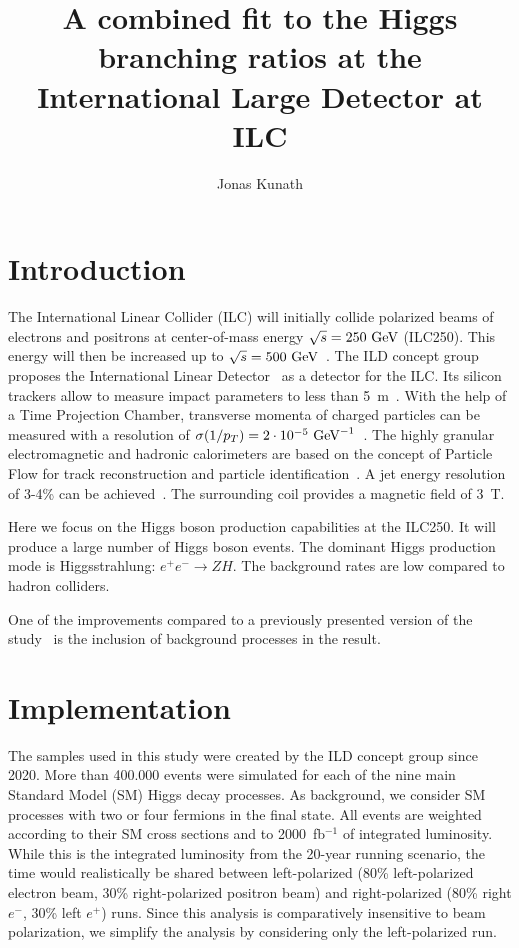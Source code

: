 \documentclass[a4paper,11pt]{article}
\title{A combined fit to the Higgs branching ratios at the International Large Detector at ILC}
\author*[a,\dag]{Jonas Kunath}
\affiliation[a]{Laboratoire Leprince-Ringuet, IN2P3-CNRS, École Polytechnique, Institut Polytechnique de Paris\\
Route de Saclay, 91120 Palaiseau, France}
\newcommand{\eV}{\text{e\kern-0.15ex V}\xspace}
\newcommand{\GeV}{\text{G\eV}\xspace}
\begin{document}
\maketitle

\section{Introduction}
The International Linear Collider (ILC) will initially collide polarized beams
of electrons and positrons at center-of-mass energy $\sqrt{s}=250~\GeV$ (ILC250).
This energy will then be increased up to $\sqrt{s}=500~\GeV$~\cite{ILC_Staging_2017}.
The ILD concept group proposes the International Linear Detector~\cite{ILD_DBD,ILD_IDR}
as a detector for the ILC.
Its silicon trackers allow to measure impact parameters to less than 5~{\textmu}m~\cite{ILD_IDR}.
With the help of a Time Projection Chamber, transverse momenta of charged particles
can be measured with a resolution of $\sigma(1/p_T) = 2 \cdot 10^{-5}~\GeV^{-1}$~\cite{ILD_IDR}.
The highly granular electromagnetic and hadronic calorimeters
are based on the concept of Particle Flow
for track reconstruction and particle identification~\cite{ParticleFlow}.
A jet energy resolution of 3-4\% can be achieved~\cite{ILD_IDR}.
The surrounding coil provides a magnetic field of 3~T.

Here we focus on the Higgs boson production capabilities at the ILC250.
It will produce a large number of Higgs boson events.
The dominant Higgs production mode is Higgsstrahlung: $e^+e^- \to ZH$.
The background rates are low compared to hadron colliders.

One of the improvements compared to
a previously presented version of the study~\cite{LCWS_combined_Higgs}
is the inclusion of background processes in the result.

\section{Implementation}\label{sec:Implementation}
The samples used in this study were created by the ILD concept group since 2020.
More than 400.000 events were simulated for each of the nine main Standard Model (SM)
Higgs decay processes.
As background, we consider SM processes
with two or four fermions in the final state.
All events are weighted according to their SM cross sections
and to 2000~fb$^{-1}$ of integrated luminosity.
While this is the integrated luminosity from the 20-year running scenario,
the time would realistically be shared
between left-polarized
(80\% left-polarized electron beam, 30\% right-polarized positron beam)
and right-polarized (80\% right $e^-$, 30\% left $e^+$) runs.
Since this analysis is comparatively insensitive to beam polarization,
we simplify the analysis by considering only the left-polarized run.
\end{document}
